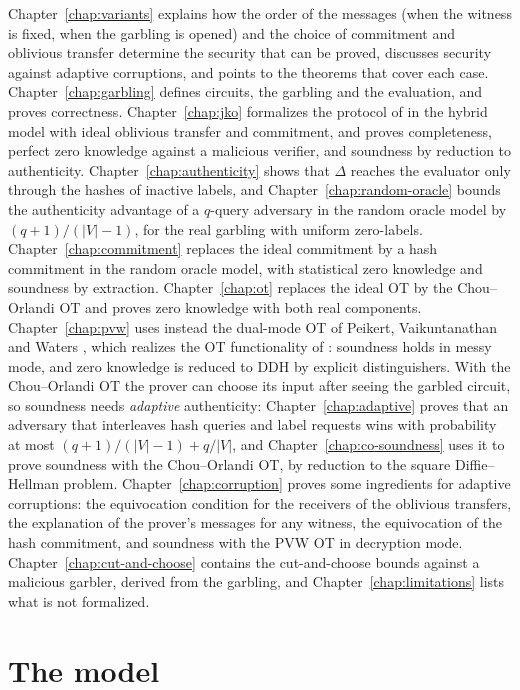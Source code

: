 Chapter~\ref{chap:variants} explains how the order of the messages (when the witness is fixed, when
the garbling is opened) and the choice of commitment and oblivious transfer determine the security
that can be proved, discusses security against adaptive corruptions, and points to the theorems
that cover each case. Chapter~\ref{chap:garbling} defines circuits, the garbling and the evaluation, and proves
correctness. Chapter~\ref{chap:jko} formalizes the protocol of \cite{JKO13} in the hybrid model
with ideal oblivious transfer and commitment, and proves completeness, perfect zero knowledge
against a malicious verifier, and soundness by reduction to authenticity.
Chapter~\ref{chap:authenticity} shows that $\Delta$ reaches the evaluator only through the hashes
of inactive labels, and Chapter~\ref{chap:random-oracle} bounds the authenticity advantage of a
$q$-query adversary in the random oracle model by $(q+1)/(|V|-1)$, for the real garbling with
uniform zero-labels. Chapter~\ref{chap:commitment} replaces the ideal commitment by a hash
commitment in the random oracle model, with statistical zero knowledge and soundness by
extraction. Chapter~\ref{chap:ot} replaces the ideal OT by the Chou--Orlandi OT and proves zero
knowledge with both real components. Chapter~\ref{chap:pvw} uses instead the dual-mode OT of
Peikert, Vaikuntanathan and Waters \cite{PVW08}, which realizes the OT functionality of
\cite{JKO13}: soundness holds in messy mode, and zero knowledge is reduced to DDH by explicit
distinguishers. With the Chou--Orlandi OT the prover can choose its input after seeing the garbled
circuit, so soundness needs \emph{adaptive} authenticity: Chapter~\ref{chap:adaptive} proves that
an adversary that interleaves hash queries and label requests wins with probability at most
$(q+1)/(|V|-1) + q/|V|$, and Chapter~\ref{chap:co-soundness} uses it to prove soundness with the
Chou--Orlandi OT, by reduction to the square Diffie--Hellman problem.
Chapter~\ref{chap:corruption} proves some ingredients for adaptive corruptions: the equivocation
condition for the receivers of the oblivious transfers, the explanation of the prover's messages
for any witness,
the equivocation of the hash commitment, and soundness with the PVW OT in decryption mode.
Chapter~\ref{chap:cut-and-choose} contains the cut-and-choose bounds against a malicious garbler,
derived from the garbling, and Chapter~\ref{chap:limitations} lists what is not formalized.

\section*{The model}

